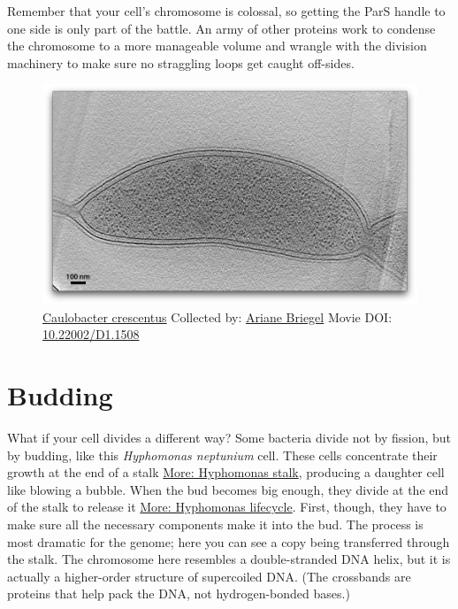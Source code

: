 \documentclass[]{tufte-book}
\begin{document}
Remember that your cell's chromosome is colossal, so getting the ParS
handle to one side is only part of the battle. An army of other proteins
work to condense the chromosome to a more manageable volume and wrangle
with the division machinery to make sure no straggling loops get caught
off-sides.





\begin{figure}
\includegraphics{movie_stills/5_2} \caption[\protect\hyperlink{tree}{Caulobacter crescentus} Collected by:
\protect\hyperlink{ariane_briegel}{Ariane Briegel} Movie DOI:
\href{https://doi.org/10.22002/D1.1508}{10.22002/D1.1508}]{\protect\hyperlink{tree}{Caulobacter crescentus} Collected by:
\protect\hyperlink{ariane_briegel}{Ariane Briegel} Movie DOI:
\href{https://doi.org/10.22002/D1.1508}{10.22002/D1.1508}}\label{fig:5-2}
\end{figure}

\section{Budding}\label{budding}

What if your cell divides a different way? Some bacteria divide not by
fission, but by budding, like this \emph{Hyphomonas neptunium} cell.
These cells concentrate their growth at the end of a stalk
\protect\hyperlink{Hyphomonas_stalk}{More: Hyphomonas stalk}, producing
a daughter cell like blowing a bubble. When the bud becomes big enough,
they divide at the end of the stalk to release it
\protect\hyperlink{Hyphomonas_lifecycle}{More: Hyphomonas lifecycle}.
First, though, they have to make sure all the necessary components make
it into the bud. The process is most dramatic for the genome; here you
can see a copy being transferred through the stalk. The chromosome here
resembles a double-stranded DNA helix, but it is actually a higher-order
structure of supercoiled DNA. (The crossbands are proteins that help
pack the DNA, not hydrogen-bonded bases.)
\end{document}
